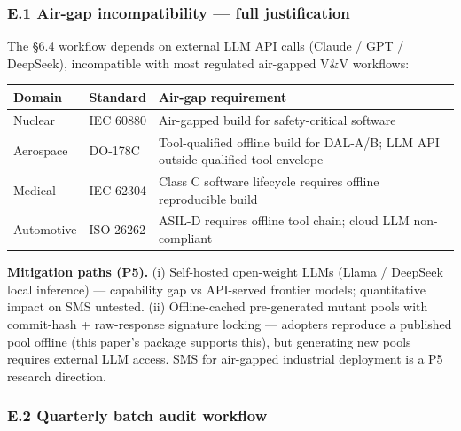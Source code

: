 \documentclass[review,12pt,authoryear]{elsarticle}
\newcounter{none}                   %
\begin{document}
\subsubsection{E.1 Air-gap incompatibility --- full
justification}\label{e.1-air-gap-incompatibility-full-justification}

The §6.4 workflow depends on external LLM API calls (Claude / GPT /
DeepSeek), incompatible with most regulated air-gapped V\&V workflows:

{\def\LTcaptype{none} %
\begin{longtable}[]{@{}
  >{\raggedright\arraybackslash}p{}
  >{\raggedright\arraybackslash}p{}
  >{\raggedright\arraybackslash}p{}@{}}
\toprule\noalign{}
\begin{minipage}[b]{\linewidth}\raggedright
Domain
\end{minipage} & \begin{minipage}[b]{\linewidth}\raggedright
Standard
\end{minipage} & \begin{minipage}[b]{\linewidth}\raggedright
Air-gap requirement
\end{minipage} \\
\midrule\noalign{}
\endhead
\bottomrule\noalign{}
\endlastfoot
Nuclear & IEC 60880 & Air-gapped build for safety-critical software \\
Aerospace & DO-178C & Tool-qualified offline build for DAL-A/B; LLM API
outside qualified-tool envelope \\
Medical & IEC 62304 & Class C software lifecycle requires offline
reproducible build \\
Automotive & ISO 26262 & ASIL-D requires offline tool chain; cloud LLM
non-compliant \\
\end{longtable}
}

\textbf{Mitigation paths (P5).} (i) Self-hosted open-weight LLMs (Llama
/ DeepSeek local inference) --- capability gap vs API-served frontier
models; quantitative impact on SMS untested. (ii) Offline-cached
pre-generated mutant pools with commit-hash + raw-response signature
locking --- adopters reproduce a published pool offline (this paper's
package supports this), but generating new pools requires external LLM
access. SMS for air-gapped industrial deployment is a P5 research
direction.

\subsubsection{E.2 Quarterly batch audit
workflow}\label{e.2-quarterly-batch-audit-workflow}
\end{document}
